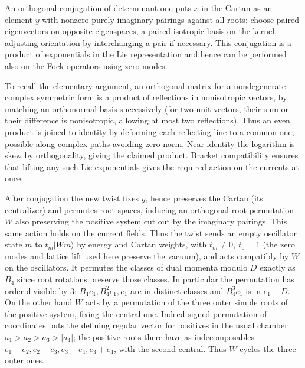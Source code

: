An orthogonal conjugation of determinant one puts \(x\) in the Cartan as an element \(y\) with nonzero purely imaginary pairings against all roots: choose paired eigenvectors on opposite eigenspaces, a paired isotropic basis on the kernel, adjusting orientation by interchanging a pair if necessary. This conjugation is a product of exponentials in the Lie representation and hence can be performed also on the Fock operators using zero modes.

To recall the elementary argument, an orthogonal matrix for a nondegenerate complex symmetric form is a product of reflections in nonisotropic vectors, by matching an orthonormal basis successively (for two unit vectors, their sum or their difference is nonisotropic, allowing at most two reflections). Thus an even product is joined to identity by deforming each reflecting line to a common one, possible along complex paths avoiding zero norm. Near identity the logarithm is skew by orthogonality, giving the claimed product. Bracket compatibility ensures that lifting any such Lie exponentials gives the required action on the currents at once.

After conjugation the new twist fixes \(y\), hence preserves the Cartan (its centralizer) and permutes root spaces, inducing an orthogonal root permutation \(W\) also preserving the positive system cut out by the imaginary pairings. This same action holds on the current fields. Thus the twist sends an empty oscillator state \(m\) to \(t_m|Wm\rangle\) by energy and Cartan weights, with \(t_m\ne0,\ t_0=1\) (the zero modes and lattice lift used here preserve the vacuum), and acts compatibly by \(W\) on the oscillators. It permutes the classes of dual momenta modulo \(D\) exactly as \(B_4\) since root rotations preserve those classes. In particular the permutation has order divisible by 3: \(B_4 e_1,B_4^2 e_1,e_1\) are in distinct classes and \(B_4^3 e_1\) is in \(e_1+D\). On the other hand \(W\) acts by a permutation of the three outer simple roots of the positive system, fixing the central one. Indeed signed permutation of coordinates puts the defining regular vector for positives in the usual chamber \(a_1>a_2>a_3>|a_4|\); the positive roots there have as indecomposables \(e_1-e_2,e_2-e_3,e_3-e_4,e_3+e_4\), with the second central. Thus \(W\) cycles the three outer ones.

